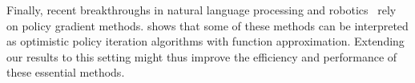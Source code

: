 

Finally, recent breakthroughs in natural language processing and robotics~\citep{Schulman2017ProximalAlgorithms} rely on policy gradient methods.
\citet{Wagner2013OptimisticResult} shows that some of these methods can be interpreted as optimistic policy iteration algorithms with function approximation.
Extending our results to this setting might thus improve the efficiency and performance of these essential methods.



